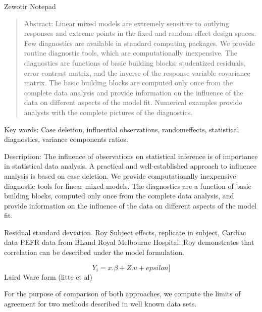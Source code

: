 \documentclass[12pt, a4paper]{article}
\begin{document}
Zewotir Notepad

\begin{quote}
	Abstract: Linear mixed models are extremely sensitive to outlying responses and extreme points in the fixed and random effect design spaces. Few diagnostics are available in standard computing packages. We provide routine diagnostic tools, which are computationally inexpensive. The diagnostics
	are functions of basic building blocks: studentized residuals, error contrast matrix, and the inverse of the response variable covariance matrix. The basic building blocks are computed only once from the complete data analysis and provide information on the influence of the data on different aspects
	of the model fit. Numerical examples provide analysts with the complete pictures of the diagnostics.
\end{quote}
Key words: Case deletion, influential observations, randomeffects, statistical
diagnostics, variance components ratios.


Description: The influence of observations on statistical inference is of importance in statistical data analysis. 
A practical and well-established approach to influence analysis is based on case deletion. 
We provide computationally inexpensive diagnostic tools for linear mixed models. 
The diagnostics are a function of basic building blocks, computed only once from the complete data analysis, 
and provide information on the influence of the data on different aspects of the model fit.


Residual standard deviation.
Roy Subject effects, replicate in subject,
Cardiac data PEFR data from BLand
Royal Melbourne Hospital.
Roy demonstrates that correlation can be described under the model formulation.

\[Y_i = x.\beta + Z.u + epsilon]\]
Laird Ware form (litte et al)




For the purpose of comparison of both approaches, we compute the limits of agreement for two methods described in 
well known data sets.

\end{document}
